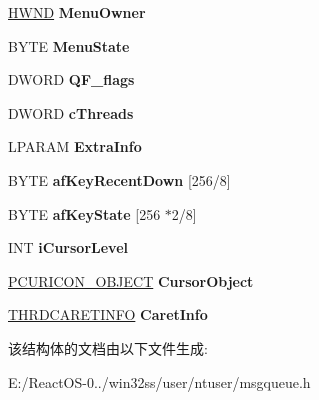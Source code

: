 \begin{DoxyCompactItemize}
\hyperlink{interfacevoid}{H\+W\+ND} {\bfseries Menu\+Owner}
\item 
\mbox{\label{struct___u_s_e_r___m_e_s_s_a_g_e___q_u_e_u_e_a8f2c397290b2deee2a6d5567b79a3f5d}} 
B\+Y\+TE {\bfseries Menu\+State}
\item 
\mbox{\label{struct___u_s_e_r___m_e_s_s_a_g_e___q_u_e_u_e_a01d7cf3b673db7d7ddc4660b115668d9}} 
D\+W\+O\+RD {\bfseries Q\+F\+\_\+flags}
\item 
\mbox{\label{struct___u_s_e_r___m_e_s_s_a_g_e___q_u_e_u_e_a8394f92e2e2dc70e64c93562311124d7}} 
D\+W\+O\+RD {\bfseries c\+Threads}
\item 
\mbox{\label{struct___u_s_e_r___m_e_s_s_a_g_e___q_u_e_u_e_ae5c7394c75c281479c8d7e5963c7690d}} 
L\+P\+A\+R\+AM {\bfseries Extra\+Info}
\item 
\mbox{\label{struct___u_s_e_r___m_e_s_s_a_g_e___q_u_e_u_e_aee968c3991c3b951fa463c7de5693d05}} 
B\+Y\+TE {\bfseries af\+Key\+Recent\+Down} \mbox{[}256/8\mbox{]}
\item 
\mbox{\label{struct___u_s_e_r___m_e_s_s_a_g_e___q_u_e_u_e_a1af08bcea8fdbf177a87c4002ca2731e}} 
B\+Y\+TE {\bfseries af\+Key\+State} \mbox{[}256 $\ast$2/8\mbox{]}
\item 
\mbox{\label{struct___u_s_e_r___m_e_s_s_a_g_e___q_u_e_u_e_a1111f2674cc9e4f8464d80f16c2961ef}} 
I\+NT {\bfseries i\+Cursor\+Level}
\item 
\mbox{\label{struct___u_s_e_r___m_e_s_s_a_g_e___q_u_e_u_e_ad0599b7a2867ac742ebbe2f49cc62b69}} 
\hyperlink{struct___c_u_r_i_c_o_n___o_b_j_e_c_t}{P\+C\+U\+R\+I\+C\+O\+N\+\_\+\+O\+B\+J\+E\+CT} {\bfseries Cursor\+Object}
\item 
\mbox{\label{struct___u_s_e_r___m_e_s_s_a_g_e___q_u_e_u_e_aaa705f8a2395b9ff6bbedc814eab875f}} 
\hyperlink{struct___t_h_r_d_c_a_r_e_t_i_n_f_o}{T\+H\+R\+D\+C\+A\+R\+E\+T\+I\+N\+FO} {\bfseries Caret\+Info}
\end{DoxyCompactItemize}


该结构体的文档由以下文件生成\+:\begin{DoxyCompactItemize}
\item 
E\+:/\+React\+O\+S-\/0../win32ss/user/ntuser/msgqueue.\+h\end{DoxyCompactItemize}
